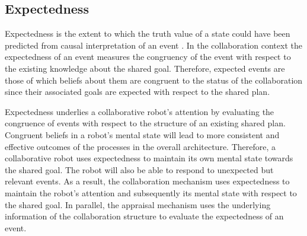 \documentclass[letterpaper]{article}
\begin{document}
\subsection{Expectedness}

Expectedness is the extent to which the truth value of a state could have been
predicted from causal interpretation of an event
\cite{marsella:ema-process-model}. In the collaboration context the expectedness
of an event measures the congruency of the event with respect to the existing
knowledge about the shared goal. Therefore, expected events are those of which
beliefs about them are congruent to the status of the collaboration since their
associated goals are expected with respect to the shared plan.

Expectedness underlies a collaborative robot's attention by evaluating the
congruence of events with respect to the structure of an existing shared plan.
Congruent beliefs in a robot's mental state will lead to more consistent and
effective outcomes of the processes in the overall architecture. Therefore,
a collaborative robot uses expectedness to maintain its own mental state towards
the shared goal. The robot will also be able to respond to unexpected but
relevant events. As a result, the collaboration mechanism uses expectedness to
maintain the robot's attention and subsequently its mental state with respect to
the shared goal. In parallel, the appraisal mechanism uses the underlying
information of the collaboration structure to evaluate the expectedness of an
event.
\end{document}
